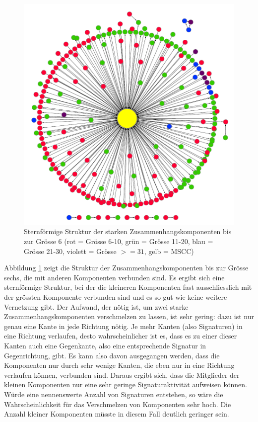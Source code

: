 \begin{figure}[th!]
  \centering
  \includegraphics[scale=0.7]{images/component-metagraph-8.pdf}
  \caption{Sternf\"ormige Struktur der starken
    Zusammenhangskomponenten bis zur Grösse 6 (rot = Grösse 6-10, grün
    = Grösse 11-20, blau = Grösse 21-30, violett = Grösse $>= 31$,
    gelb = MSCC)}
  \label{fig:komponenten-struktur}
\end{figure}

Abbildung \ref{fig:komponenten-struktur} zeigt die Struktur der
Zusammenhangskomponenten bis zur Gr\"osse sechs, die mit anderen
Komponenten verbunden sind. Es ergibt sich eine sternf\"ormige
Struktur, bei der die kleineren Komponenten fast ausschliesslich mit
der gr\"ossten Komponente verbunden sind und es so gut wie keine
weitere Vernetzung gibt. Der Aufwand, der n\"otig ist, um zwei starke
Zusammenhangskomponenten verschmelzen zu lassen, ist sehr gering: dazu
ist nur genau eine Kante in jede Richtung n\"otig. Je mehr Kanten
(also Signaturen) in eine Richtung verlaufen, desto wahrscheinlicher
ist es, dass es zu einer dieser Kanten auch eine Gegenkante, also eine
entsprechende Signatur in Gegenrichtung, gibt. Es kann also davon
ausgegangen werden, dass die Komponenten nur durch sehr wenige Kanten,
die eben nur in eine Richtung verlaufen k\"onnen, verbunden
sind. Daraus ergibt sich, dass die Mitglieder der kleinen Komponenten
nur eine sehr geringe Signaturaktivit\"at aufweisen k\"onnen. W\"urde
eine nennenswerte Anzahl von Signaturen entstehen, so w\"are die
Wahrscheinlichkeit f\"ur das Verschmelzen von Komponenten sehr
hoch. Die Anzahl kleiner Komponenten m\"usste in diesem Fall deutlich
geringer sein.

